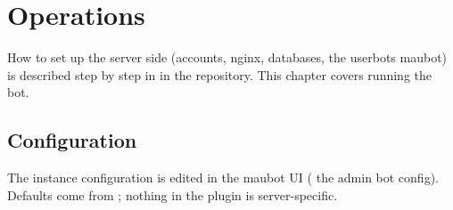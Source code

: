 \chapter{Operations}
\label{ch:operations}

How to set up the server side (accounts, nginx, databases, the userbots maubot) is
described step by step in  in the 
repository. This chapter covers running the bot.

\section{Configuration}

The instance configuration is edited in the maubot UI ( \then{} the admin bot
\then{} config). Defaults come from ; nothing in the plugin is
server-specific.

